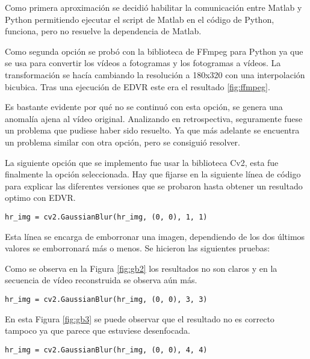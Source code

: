     Como primera aproximación se decidió habilitar la comunicación entre Matlab y Python permitiendo ejecutar el script de Matlab en el código de Python, funciona, pero no resuelve la dependencia de Matlab.

    Como segunda opción se probó con la biblioteca de FFmpeg para Python ya que se usa para convertir los vídeos a fotogramas y los fotogramas a vídeos. La transformación se hacía cambiando la resolución a 180x320 con una interpolación bicubica. Tras una ejecución de EDVR este era el resultado \ref{fig:ffmpeg}.

    
    Es bastante evidente por qué no se continuó con esta opción, se genera una anomalía ajena al vídeo original. Analizando en retrospectiva, seguramente fuese un problema que pudiese haber sido resuelto. Ya que más adelante se encuentra un problema similar con otra opción, pero se consiguió resolver.

    La siguiente opción que se implemento fue usar la biblioteca Cv2, esta fue finalmente la opción seleccionada. Hay que fijarse en la siguiente línea de código  para explicar las diferentes versiones que se probaron hasta obtener un resultado optimo con EDVR.

    \texttt{hr\_img = cv2.GaussianBlur(hr\_img, (0, 0), 1, 1)}

    Esta línea se encarga de emborronar una imagen, dependiendo de los dos últimos valores se emborronará más o menos. Se hicieron las siguientes pruebas:

    
    Como se observa en la Figura \ref{fig:gb2} los resultados no son claros y en la secuencia de vídeo reconstruida se observa aún más.
    
     \texttt{hr\_img = cv2.GaussianBlur(hr\_img, (0, 0), 3, 3)}

    
    En esta Figura \ref{fig:gb3} se puede observar que el resultado no es correcto tampoco ya que parece que estuviese desenfocada.

     \texttt{hr\_img = cv2.GaussianBlur(hr\_img, (0, 0), 4, 4)}

    
